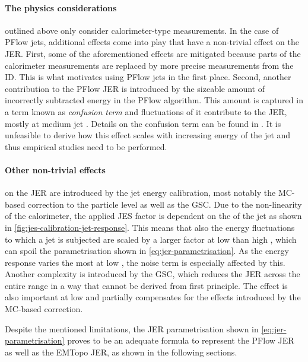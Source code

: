 \paragraph{The physics considerations} outlined above only consider calorimeter-type measurements. 
In the case of PFlow jets, additional effects come into play that have a non-trivial effect on the JER.
First, some of the aforementioned effects are mitigated because parts of the calorimeter measurements are replaced by more precise measurements from the ID. This is what motivates using PFlow jets in the first place.
Second, another contribution to the PFlow JER is introduced by the sizeable amount of incorrectly subtracted energy in the PFlow algorithm. 
This amount is captured in a term known as \emph{confusion term} and fluctuations of it contribute to the JER, mostly at medium jet \pT. Details on the confusion term can be found in . It is unfeasible to derive how this effect scales with increasing energy of the jet and thus empirical studies need to be performed. 

\paragraph{Other non-trivial effects} on the JER are introduced by the jet energy calibration, most notably the MC-based correction to the particle level as well as the GSC. 
Due to the non-linearity of the calorimeter, the applied JES factor is dependent on the \pT of the jet as shown in \cref{fig:jes-calibration-jet-response}. This means that also the energy fluctuations to which a jet is subjected are scaled by a larger factor at low \pT than high \pT, which can spoil the parametrisation shown in \cref{eq:jer-parametrisation}. 
As the energy response varies the most at low \pT, the noise term is especially affected by this. 
Another complexity is introduced by the GSC, which reduces the JER across the entire \pT range in a way that cannot be derived from first principle. The effect is also important at low \pT and partially compensates for the effects introduced by the MC-based correction. 

Despite the mentioned limitations, the JER parametrisation shown in \cref{eq:jer-parametrisation} proves to be an adequate formula to represent the PFlow JER as well as the EMTopo JER, as shown in the following sections.



